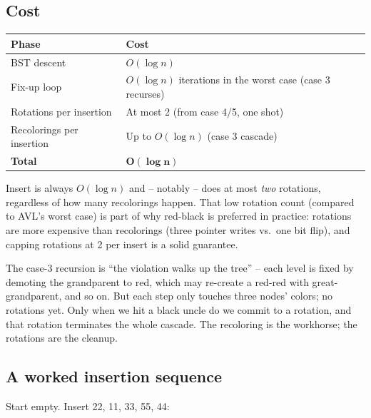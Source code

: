 \documentclass[11pt]{article}
\begin{document}
\subsection*{Cost}

\begin{center}
\begin{tabular}{ll}
Phase & Cost \\
\hline
BST descent              & $O(\log n)$ \\
Fix-up loop              & $O(\log n)$ iterations in the worst case (case 3 recurses) \\
Rotations per insertion  & At most 2 (from case 4/5, one shot) \\
Recolorings per insertion & Up to $O(\log n)$ (case 3 cascade) \\
\hline
\textbf{Total}           & $\mathbf{O(\log n)}$ \\
\end{tabular}
\end{center}

Insert is always $O(\log n)$ and -- notably -- does at most \emph{two} rotations, regardless of how many recolorings happen. That low rotation count (compared to AVL's worst case) is part of why red-black is preferred in practice: rotations are more expensive than recolorings (three pointer writes vs.\ one bit flip), and capping rotations at 2 per insert is a solid guarantee.

\begin{ideabox}
The case-3 recursion is ``the violation walks up the tree'' -- each level is fixed by demoting the grandparent to red, which may re-create a red-red with great-grandparent, and so on. But each step only touches three nodes' colors; no rotations yet. Only when we hit a black uncle do we commit to a rotation, and that rotation terminates the whole cascade. The recoloring is the workhorse; the rotations are the cleanup.
\end{ideabox}

\subsection*{A worked insertion sequence}

Start empty. Insert 22, 11, 33, 55, 44:
\end{document}
